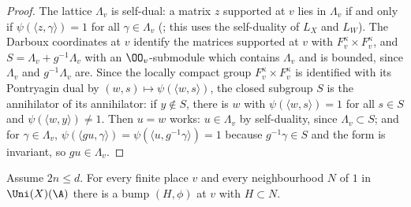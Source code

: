 \begin{proof}
The lattice $\Lambda_v$ is self-dual: a matrix $z$ supported at $v$ lies in $\Lambda_v$ if and only if $\psi(\langle z,\gamma\rangle)=1$ for all
$\gamma\in\Lambda_v$ (; this uses the self-duality of $L_X$ and
$L_W$). The Darboux coordinates at $v$ identify the matrices supported at $v$ with $F_v^\kappa\times F_v^\kappa$, and
$S=\Lambda_v+g^{-1}\Lambda_v$ with an $\OO_v$-submodule which contains $\Lambda_v$ and is bounded, since $\Lambda_v$ and $g^{-1}\Lambda_v$
are. Since the locally compact group $F_v^\kappa\times F_v^\kappa$ is identified with its Pontryagin dual by
$(w,s)\mapsto\psi(\langle w,s\rangle)$, the closed subgroup $S$ is the annihilator of its annihilator: if $y\notin S$, there is $w$ with
$\psi(\langle w,s\rangle)=1$ for all $s\in S$ and $\psi(\langle w,y\rangle)\ne1$. Then $u=w$ works:
$u\in\Lambda_v$ by self-duality, since $\Lambda_v\subset S$; and for $\gamma\in\Lambda_v$,
$\psi(\langle gu,\gamma\rangle)=\psi(\langle u,g^{-1}\gamma\rangle)=1$ because $g^{-1}\gamma\in S$ and the form is invariant, so $gu\in\Lambda_v$.
\end{proof}

\begin{proposition}\label{pf:tlift:bumpany}
Assume $2n\le d$. For every finite place $v$ and every neighbourhood $N$ of $1$ in $\Uni(X)(\A)$ there is a bump
$(H,\phi)$ at $v$ with $H\subset N$.
\end{proposition}

